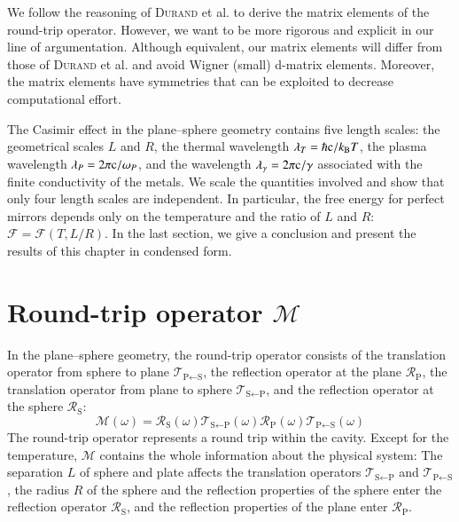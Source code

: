 We follow the reasoning of \textsc{Durand} et al. \cite{Durand,
ThermalCasimirEffect} to derive the matrix elements of the round-trip operator.
However, we want to be more rigorous and explicit in our line of argumentation.
Although equivalent, our matrix elements will differ from those of
\textsc{Durand} et al. and avoid Wigner (small) d-matrix elements. Moreover,
the matrix elements have symmetries that can be exploited to decrease
computational effort.

The Casimir effect in the plane--sphere geometry contains five length scales:
the geometrical scales $L$ and $R$, the thermal wavelength $\lambda_T =
\hbar\mathrm{c}/k_\text{B} T$, the plasma wavelength $\lambda_P=2\pi\mathrm{c}/\omega_P$, and the
wavelength $\lambda_\gamma = 2\pi\mathrm{c}/\gamma$ associated with the finite
conductivity of the metals. We scale the quantities involved and show that only
four length scales are independent. In particular, the free energy for perfect
mirrors depends only on the temperature and the ratio of $L$ and $R$:
$\mathcal{F} = \mathcal{F}(T,L/R)$. In the last section, we give a conclusion
and present the results of this chapter in condensed form.


\section{Round-trip operator $\mathcal{M}$}

In the plane--sphere geometry, the round-trip operator consists of the
translation operator from sphere to plane
$\mathcal{T}_{\text{P}\leftarrow\text{S}}$, the reflection operator at the
plane $\mathcal{R}_\text{P}$, the translation operator from plane to sphere
$\mathcal{T}_{\text{S}\leftarrow\text{P}}$, and the reflection operator at the
sphere $\mathcal{R}_\text{S}$:
\begin{equation}
\mathcal{M}(\omega) = \mathcal{R}_\text{S}(\omega) \mathcal{T}_{\text{S}\leftarrow\text{P}}(\omega) \mathcal{R}_\text{P}(\omega) \mathcal{T}_{\text{P}\leftarrow\text{S}}(\omega)
\end{equation}
The round-trip operator represents a round trip within the cavity.
Except for
the temperature, $\mathcal{M}$ contains the whole information about
the physical system: The separation $L$ of sphere and
plate affects the translation operators
$\mathcal{T}_{\text{S}\leftarrow\text{P}}$ and
$\mathcal{T}_{\text{P}\leftarrow\text{S}}$, the radius $R$ of the sphere and the
reflection properties of the sphere enter the reflection operator
$\mathcal{R}_\text{S}$, and the reflection properties of the plane enter
$\mathcal{R}_\text{P}$.

